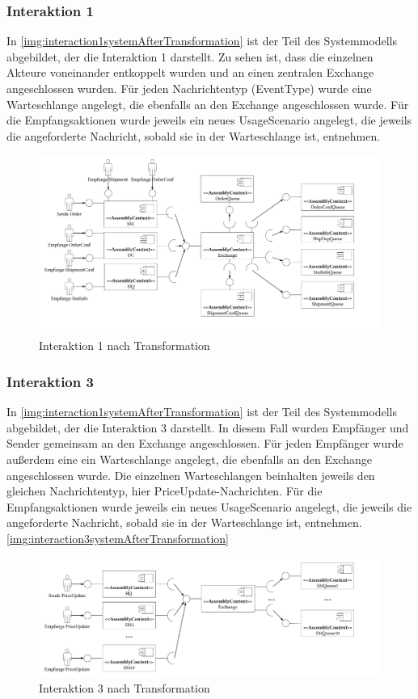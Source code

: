 \subsubsection{Interaktion 1}
In \autoref{img:interaction1systemAfterTransformation} ist der Teil des Systemmodells abgebildet, der die Interaktion 1 darstellt. Zu sehen ist, dass die einzelnen Akteure voneinander entkoppelt wurden und an einen zentralen Exchange angeschlossen wurden. Für jeden Nachrichtentyp (EventType) wurde eine Warteschlange angelegt, die ebenfalls an den Exchange angeschlossen wurde. Für die Empfangsaktionen wurde jeweils ein neues UsageScenario angelegt, die jeweils die angeforderte Nachricht, sobald sie in der Warteschlange ist, entnehmen.
\begin{figure}
\center
  \includegraphics[width=1\textwidth]{images/evaluation/specjms/evaluationInteraktion1new.pdf}
  \caption{Interaktion 1 nach Transformation}
  \label{img:interaction1systemAfterTransformation}
\end{figure}
\subsubsection{Interaktion 3}
In \autoref{img:interaction1systemAfterTransformation} ist der Teil des Systemmodells abgebildet, der die Interaktion 3 darstellt. In diesem Fall wurden Empfänger und Sender gemeinsam an den Exchange angeschlossen. Für jeden Empfänger wurde außerdem eine ein Warteschlange angelegt, die ebenfalls an den Exchange angeschlossen wurde. Die einzelnen Warteschlangen beinhalten jeweils den gleichen Nachrichtentyp, hier PriceUpdate-Nachrichten. Für die Empfangsaktionen wurde jeweils ein neues UsageScenario angelegt, die jeweils die angeforderte Nachricht, sobald sie in der Warteschlange ist, entnehmen.
\autoref{img:interaction3systemAfterTransformation}
\begin{figure}
\center
  \includegraphics[width=1\textwidth]{images/evaluation/specjms/evaluationInteraktion3new.pdf}
  \caption{Interaktion 3 nach Transformation}
  \label{img:interaction3systemAfterTransformation}
\end{figure}


